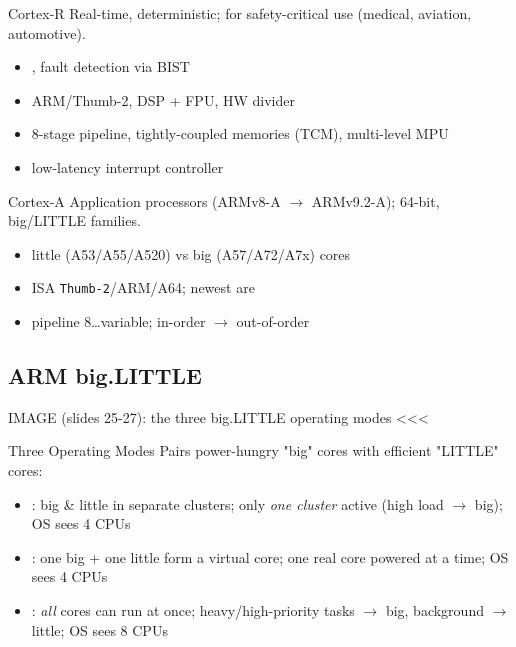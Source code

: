 
\begin{definition}{Cortex-R}
    Real-time, deterministic; for safety-critical use (medical, aviation, automotive).
    \begin{itemize}
        \item {}, fault detection via BIST
        \item ARM/Thumb-2, DSP + FPU, HW divider
        \item 8-stage pipeline, tightly-coupled memories (TCM), multi-level MPU
        \item low-latency interrupt controller
    \end{itemize}
\end{definition}

\begin{definition}{Cortex-A}
    Application processors (ARMv8-A $\to$ ARMv9.2-A); 64-bit, big/LITTLE families.
    \begin{itemize}
        \item little (A53/A55/A520) vs big (A57/A72/A7x) cores
        \item ISA \texttt{Thumb-2}/ARM/A64; newest are 
        \item pipeline 8\dots variable; in-order $\to$ out-of-order
    \end{itemize}
\end{definition}

\multend

\subsection{ARM big.LITTLE}

IMAGE (slides 25-27): the three big.LITTLE operating modes <<<

\begin{definition}{Three Operating Modes}
    Pairs power-hungry "big" cores with efficient "LITTLE" cores:
    \begin{itemize}
        \item {}: big \& little in separate clusters;
              only \emph{one cluster} active (high load $\to$ big); OS sees 4 CPUs
        \item {}: one big + one little form a virtual
              core; one real core powered at a time; OS sees 4 CPUs
        \item {}: \emph{all} cores can run at once;
              heavy/high-priority tasks $\to$ big, background $\to$ little; OS sees 8 CPUs
    \end{itemize}
\end{definition}

